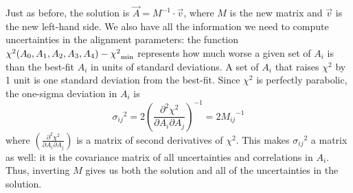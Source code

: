 \documentclass[12pt]{article}
\begin{document}
Just as before, the solution is $\vec{A} = M^{-1} \cdot \vec{v}$,
where $M$ is the new matrix and $\vec{v}$ is the new left-hand side.
We also have all the information we need to compute uncertainties in
the alignment parameters: the function $\chi^2(A_0, A_1, A_2, A_3,
A_4) - {\chi^2}_{\mbox{\scriptsize min}}$ represents how much worse a
given set of $A_i$ is than the best-fit $A_i$ in units of standard
deviations.  A set of $A_i$ that raises $\chi^2$ by 1 unit is one
standard deviation from the best-fit.  Since $\chi^2$ is perfectly
parabolic, the one-sigma deviation in $A_i$ is
\begin{equation}
{\sigma_{ij}}^2 = 2 \left(\frac{\partial^2 \chi^2}{\partial A_i
  \partial A_j}\right)^{-1} = 2 {M_{ij}}^{-1}
\end{equation}
where $\left(\frac{\partial^2 \chi^2}{\partial A_i \partial
  A_j}\right)$ is a matrix of second derivatives of $\chi^2$.  This
makes ${\sigma_{ij}}^2$ a matrix as well: it is the covariance
matrix of all uncertainties and correlations in $A_i$.  Thus,
inverting $M$ gives us both the solution and all of the uncertainties
in the solution.
\end{document}

